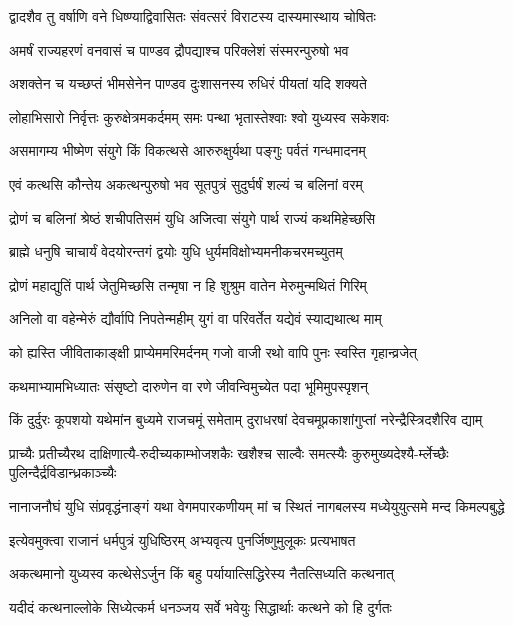 \twolineshloka
{द्वादशैव तु वर्षाणि वने धिष्ण्याद्विवासितः}
{संवत्सरं विराटस्य दास्यमास्थाय चोषितः}


\twolineshloka
{अमर्षं राज्यहरणं वनवासं च पाण्डव}
{द्रौपद्याश्च परिक्लेशं संस्मरन्पुरुषो भव}


\twolineshloka
{अशक्तेन च यच्छप्तं भीमसेनेन पाण्डव}
{दुःशासनस्य रुधिरं पीयतां यदि शक्यते}


\twolineshloka
{लोहाभिसारो निर्वृत्तः कुरुक्षेत्रमकर्दमम्}
{समः पन्था भृतास्तेश्वाः श्वो युध्यस्व सकेशवः}


\twolineshloka
{असमागम्य भीष्मेण संयुगे किं विकत्थसे}
{आरुरुक्षुर्यथा पङ्गुः पर्वतं गन्धमादनम्}


\twolineshloka
{एवं कत्थसि कौन्तेय अकत्थन्पुरुषो भव}
{सूतपुत्रं सुदुर्घर्षं शल्यं च बलिनां वरम्}


\twolineshloka
{द्रोणं च बलिनां श्रेष्ठं शचीपतिसमं युधि}
{अजित्वा संयुगे पार्थ राज्यं कथमिहेच्छसि}


\twolineshloka
{ब्राह्मे धनुषि चाचार्यं वेदयोरन्तगं द्वयोः}
{युधि धुर्यमविक्षोभ्यमनीकचरमच्युतम्}


\twolineshloka
{द्रोणं महाद्युतिं पार्थ जेतुमिच्छसि तन्मृषा}
{न हि शुश्रुम वातेन मेरुमुन्मथितं गिरिम्}


\twolineshloka
{अनिलो वा वहेन्मेरुं द्यौर्वापि निपतेन्महीम्}
{युगं वा परिवर्तेत यद्येवं स्याद्यथात्थ माम्}


\twolineshloka
{को ह्यस्ति जीविताकाङ्क्षी प्राप्येममरिमर्दनम्}
{गजो वाजी रथो वापि पुनः स्वस्ति गृहान्व्रजेत्}


\twolineshloka
{कथमाभ्यामभिध्यातः संसृष्टो दारुणेन वा}
{रणे जीवन्विमुच्येत पदा भूमिमुपस्पृशन्}


\twolineshloka
{किं दुर्दुरः कूपशयो यथेमांन बुध्यमे राजचमूं समेताम्}
{दुराधरषां देवचमूप्रकाशांगुप्तां नरेन्द्रैस्त्रिदशैरिव द्याम्}


\twolineshloka
{प्राच्यैः प्रतीच्यैरथ दाक्षिणात्यै-रुदीच्यकाम्भोजशकैः खशैश्च}
{साल्वैः समत्स्यैः कुरुमुख्यदेश्यै-र्म्लेच्छैः पुलिन्दैर्द्रविडान्ध्रकाञ्च्यैः}


\twolineshloka
{नानाजनौघं युधि संप्रवृद्धंनाङ्गं यथा वेगमपारकणीयम्}
{मां च स्थितं नागबलस्य मध्येयुयुत्समे मन्द किमल्पबुद्धे}


\twolineshloka
{इत्येवमुक्त्वा राजानं धर्मपुत्रं युधिष्ठिरम्}
{अभ्यवृत्य पुनर्जिष्णुमुलूकः प्रत्यभाषत}


\twolineshloka
{अकत्थमानो युध्यस्व कत्थेसेऽर्जुन किं बहु}
{पर्यायात्सिद्धिरेस्य नैतत्सिध्यति कत्थनात्}


\twolineshloka
{यदीदं कत्थनाल्लोके सिध्येत्कर्म धनञ्जय}
{सर्वे भवेयुः सिद्धार्थाः कत्थने को हि दुर्गतः}


